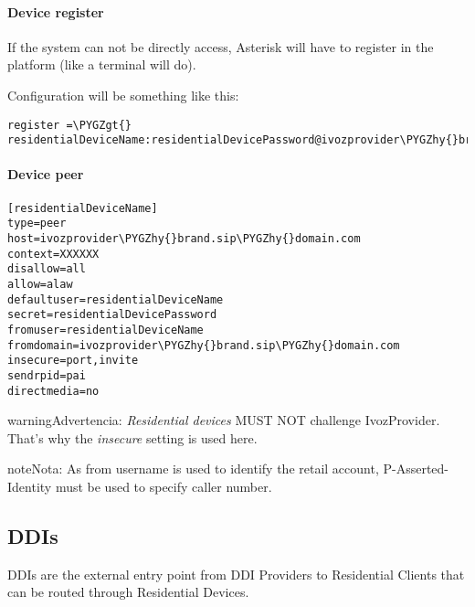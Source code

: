 \documentclass[letterpaper,10pt,spanish]{sphinxmanual}
\def\PYGZgt{\char`\>}
\def\PYGZhy{\char`\-}
\begin{document}
\paragraph{Device register}
\label{administration_portal/client/residential/residential_devices:device-register}
If the system can not be directly access, Asterisk will have to register in the
platform (like a terminal will do).

Configuration will be something like this:

\begin{Verbatim}[commandchars=\\\{\}]
register =\PYGZgt{} residentialDeviceName:residentialDevicePassword@ivozprovider\PYGZhy{}brand.sip\PYGZhy{}domain.com
\end{Verbatim}


\paragraph{Device peer}
\label{administration_portal/client/residential/residential_devices:device-peer}
\begin{Verbatim}[commandchars=\\\{\}]
[residentialDeviceName]
type=peer
host=ivozprovider\PYGZhy{}brand.sip\PYGZhy{}domain.com
context=XXXXXX
disallow=all
allow=alaw
defaultuser=residentialDeviceName
secret=residentialDevicePassword
fromuser=residentialDeviceName
fromdomain=ivozprovider\PYGZhy{}brand.sip\PYGZhy{}domain.com
insecure=port,invite
sendrpid=pai
directmedia=no
\end{Verbatim}

\begin{notice}{warning}{Advertencia:}
\emph{Residential devices} MUST NOT challenge IvozProvider. That's
why the \emph{insecure} setting is used here.
\end{notice}

\begin{notice}{note}{Nota:}
As from username is used to identify the retail account, P-Asserted-Identity must be used to specify caller number.
\end{notice}


\subsection{DDIs}
\label{administration_portal/client/residential/ddis:ddis}\label{administration_portal/client/residential/ddis:residential-ddis}\label{administration_portal/client/residential/ddis::doc}
DDIs are the external entry point from DDI Providers to Residential Clients that
can be routed through Residential Devices.
\end{document}
